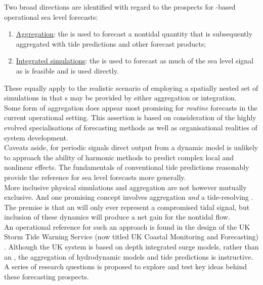 Two broad directions are identified with regard to the prospects for \OGCM{}-based operational sea level forecasts:
\begin{enumerate}
\item \underline{Aggregation}: the \OGCM{} is used to forecast a nontidal quantity that is subsequently aggregated with tide predictions and other forecast products;
\item \underline{Integrated simulations}: the \OGCM{} is used to forecast as much of the sea level signal as is feasible and is used directly.
\end{enumerate}
These equally apply to the realistic scenario of employing a spatially nested set of simulations in that \obc{}s may be provided by either aggregation or integration.\\


Some form of aggregation does appear most promising for \emph{routine} forecasts in the current operational setting.  
This assertion is based on consideration of the highly evolved specialisations of forecasting methods as well as organisational realities of system development.\\
Caveats aside, for periodic signals direct output from a dynamic model is unlikely to approach the ability of harmonic methods to predict complex local and nonlinear effects.   The fundamentals of conventional tide predictions reasonably provide the reference for sea level forecasts more generally. \\



More inclusive physical simulations and aggregation are not however mutually exclusive.  
And one promising concept involves aggregation \emph{and} a tide-resolving \OGCM{}.  The premise is that an \OGCM{} will only ever represent a compromised tidal signal, but inclusion of these dynamics will produce a net gain for the nontidal flow.\\
An operational reference for such an approach is found in the design of the UK Storm Tide Warning Service (now titled UK Coastal Monitoring and Forecasting) \cite{Horsburg:2009ui}.   Although the UK system is based on depth integrated surge models, rather than an \OGCM{}, the aggregation of hydrodynamic models and tide predictions is instructive.\\   



A series of research questions is proposed to explore and test key ideas behind these forecasting prospects.\\

